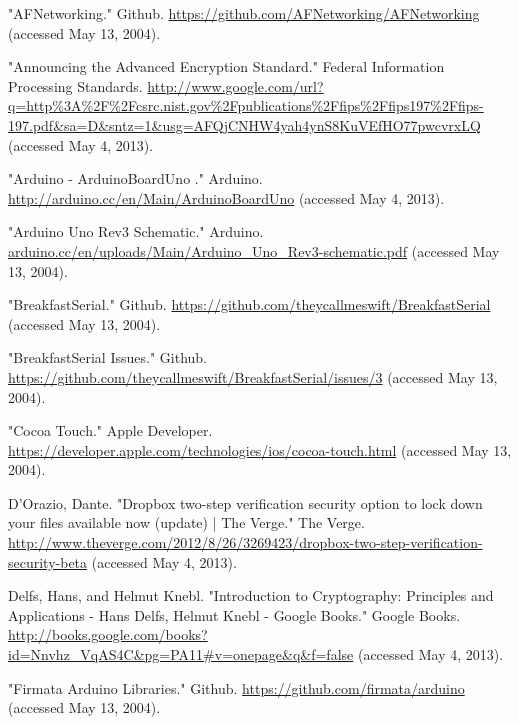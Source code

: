 \documentclass[10pt]{article}
\begin{document}
\begin{multicols}{2}



\begin{thebibliography}{99} %
  
  "AFNetworking." Github. \url{https://github.com/AFNetworking/AFNetworking} (accessed May 13, 2004).

"Announcing the Advanced Encryption Standard." Federal Information Processing Standards. \url{http://www.google.com/url?q=http\%3A\%2F\%2Fcsrc.nist.gov\%2Fpublications\%2Ffips\%2Ffips197\%2Ffips-197.pdf&sa=D&sntz=1&usg=AFQjCNHW4yah4ynS8KuVEfHO77pwcvrxLQ} (accessed May 4, 2013).

"Arduino - ArduinoBoardUno ." Arduino. \url{http://arduino.cc/en/Main/ArduinoBoardUno} (accessed May 4, 2013).

"Arduino Uno Rev3 Schematic." Arduino. \url{arduino.cc/en/uploads/Main/Arduino_Uno_Rev3-schematic.pdf} (accessed May 13, 2004).

"BreakfastSerial." Github. \url{https://github.com/theycallmeswift/BreakfastSerial} (accessed May 13, 2004).

"BreakfastSerial Issues." Github. \url{https://github.com/theycallmeswift/BreakfastSerial/issues/3} (accessed May 13, 2004).

"Cocoa Touch." Apple Developer. \url{https://developer.apple.com/technologies/ios/cocoa-touch.html} (accessed May 13, 2004).

D'Orazio, Dante. "Dropbox two-step verification security option to lock down your files available now (update) | The Verge." The Verge. \url{http://www.theverge.com/2012/8/26/3269423/dropbox-two-step-verification-security-beta} (accessed May 4, 2013).

Delfs, Hans, and Helmut Knebl. "Introduction to Cryptography: Principles and Applications - Hans Delfs, Helmut Knebl - Google Books." Google Books. \url{http://books.google.com/books?id=Nnvhz_VqAS4C&pg=PA11#v=onepage&q&f=false} (accessed May 4, 2013).

"Firmata Arduino Libraries." Github. \url{https://github.com/firmata/arduino} (accessed May 13, 2004).


\end{thebibliography}
\end{multicols}
\end{document}
